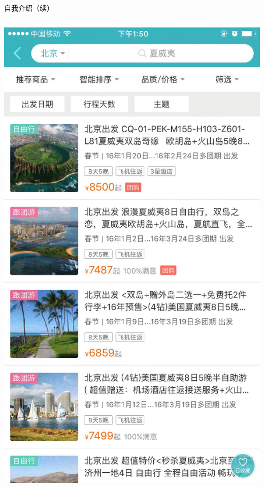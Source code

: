 \documentclass[handout]{beamer}
\begin{document}
\begin{CJK}{UTF8}{gbsn}
\begin{frame}{自我介绍（续）}
\begin{columns}
    \includegraphics[scale=0.2]{./images/mobile-search-screenshot}
  \end{columns}
\end{frame}


\end{CJK}
\end{document}
